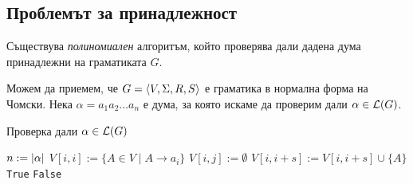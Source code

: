 \subsection{Проблемът за принадлежност}

\begin{thm}
  Съществува {\em полиномиален} алгоритъм, който проверява дали дадена дума принадлежни на граматиката $G$.
\end{thm}
Можем да приемем, че $G = \langle{V,\Sigma,R,S}\rangle$ е граматика в нормална форма на Чомски.
Нека $\alpha = a_1a_2\dots a_n$ е дума, за която искаме да проверим дали $\alpha \in \mathcal{L}(G)$.
\begin{algorithm}[H]
  \caption{Проверка дали $\alpha \in \mathcal{L}(G)$}
  \label{alg:belongs-to-grammar}
  \begin{algorithmic}[1]
    \State $n := \vert{\alpha}\vert$ 
    \State $V[i,i] := \{A \in V \mid A\rightarrow a_i\}$
    \EndFor
    \State $V[i,j] := \emptyset$
    \EndFor      
    \ForAll{$s \in [1, n)$} 
    \ForAll{$k \in [i, i + s)$}
    \State $V[i,i+s] := V[i,i+s] \cup \{A\}$
    \EndIf
    \EndFor
    \EndFor
    \EndFor
    \State \Return \texttt{True}
    \Else
    \State \Return \texttt{False}
    \EndIf
  \end{algorithmic}
\end{algorithm}

